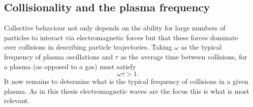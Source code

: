 \subsection{\label{sec:plasma_frequency}Collisionality and the plasma frequency}
Collective behaviour not only depends on the ability for large numbers of particles to interact via electromagnetic forces but that these forces dominate over collisions in describing particle trajectories. Taking $\omega$ as the typical frequency of plasma oscillations and $\tau$ as the average time between collisions, for a plasma (as opposed to a gas) must satisfy
\begin{equation}\label{eq:plasma_frequency_condition}
	\omega\tau > 1.
\end{equation}
It now remains to determine what is the typical frequency of collisions in a given plasma. As in this thesis electromagnetic waves are the focus this is what is most relevant.